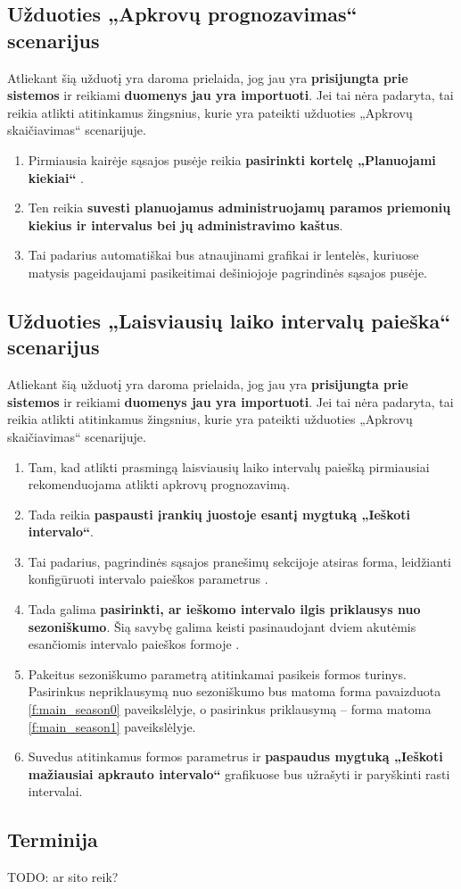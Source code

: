 
\subsection{Užduoties „Apkrovų prognozavimas“ scenarijus}

Atliekant šią užduotį yra daroma prielaida, jog jau yra
\textbf{prisijungta prie sistemos} ir reikiami \textbf{duomenys jau yra
importuoti}. Jei tai nėra padaryta, tai reikia atlikti atitinkamus
žingsnius, kurie yra pateikti užduoties „Apkrovų skaičiavimas“
scenarijuje.

\begin{enumerate}
  \item Pirmiausia kairėje sąsajos pusėje reikia \textbf{pasirinkti
    kortelę „Planuojami kiekiai“} .
  \item Ten reikia \textbf{suvesti planuojamus administruojamų paramos
    priemonių kiekius ir intervalus bei jų administravimo kaštus}.
  \item Tai padarius automatiškai bus atnaujinami grafikai ir
    lentelės, kuriuose matysis pageidaujami pasikeitimai dešiniojoje
    pagrindinės sąsajos  pusėje.
\end{enumerate}

\subsection{Užduoties „Laisviausių laiko intervalų paieška“ scenarijus}

Atliekant šią užduotį yra daroma prielaida, jog jau yra
\textbf{prisijungta prie sistemos} ir reikiami \textbf{duomenys jau
yra importuoti}. Jei tai nėra padaryta, tai reikia atlikti atitinkamus
žingsnius, kurie yra pateikti užduoties „Apkrovų skaičiavimas“
scenarijuje.

\begin{enumerate}
  \item Tam, kad atlikti prasmingą laisviausių laiko intervalų
    paiešką pirmiausiai rekomenduojama atlikti apkrovų prognozavimą.
  \item Tada reikia \textbf{paspausti įrankių juostoje 
    esantį mygtuką „Ieškoti intervalo“}.
  \item Tai padarius, pagrindinės sąsajos pranešimų sekcijoje
    atsiras forma, leidžianti konfigūruoti intervalo paieškos
    parametrus .
  \item Tada galima \textbf{pasirinkti, ar ieškomo intervalo ilgis
    priklausys nuo sezoniškumo}. Šią savybę galima keisti
    pasinaudojant dviem akutėmis esančiomis intervalo paieškos
    formoje .
  \item Pakeitus sezoniškumo parametrą atitinkamai pasikeis formos
    turinys. Pasirinkus nepriklausymą nuo sezoniškumo bus matoma forma
    pavaizduota \ref{f:main_season0} paveikslėlyje, o pasirinkus 
    priklausymą – forma matoma \ref{f:main_season1} paveikslėlyje.
  \item Suvedus atitinkamus formos parametrus ir \textbf{paspaudus
    mygtuką „Ieškoti mažiausiai apkrauto intervalo“} grafikuose bus
    užrašyti ir paryškinti rasti intervalai.
\end{enumerate}

\subsection{Terminija}
TODO: ar sito reik?
